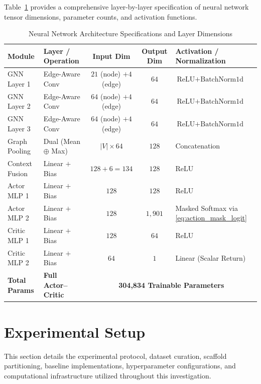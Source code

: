\documentclass{ieeeaccess}
\begin{document}
Table~\ref{tab:network_architecture} provides a comprehensive layer-by-layer specification of neural network tensor dimensions, parameter counts, and activation functions.

\begin{table}[!tbp]
\caption{Neural Network Architecture Specifications and Layer Dimensions}
\label{tab:network_architecture}
\centering
\footnotesize
\begin{tabularx}{\columnwidth}{l l c c X}
\toprule
\textbf{Module} & \textbf{Layer / Operation} & \textbf{Input Dim} & \textbf{Output Dim} & \textbf{Activation / Normalization}\\
\midrule
GNN Layer 1 & Edge-Aware Conv & $21$ (node) $+ 4$ (edge) & $64$ & $\text{ReLU} + \text{BatchNorm1d}$\\
GNN Layer 2 & Edge-Aware Conv & $64$ (node) $+ 4$ (edge) & $64$ & $\text{ReLU} + \text{BatchNorm1d}$\\
GNN Layer 3 & Edge-Aware Conv & $64$ (node) $+ 4$ (edge) & $64$ & $\text{ReLU} + \text{BatchNorm1d}$\\
Graph Pooling & Dual (Mean $\oplus$ Max) & $|V| \times 64$ & $128$ & Concatenation\\
Context Fusion & Linear $+$ Bias & $128 + 6 = 134$ & $128$ & $\text{ReLU}$\\
\midrule
Actor MLP 1 & Linear $+$ Bias & $128$ & $128$ & $\text{ReLU}$\\
Actor MLP 2 & Linear $+$ Bias & $128$ & $1,901$ & Masked Softmax via \eqref{eq:action_mask_logit}\\
\midrule
Critic MLP 1 & Linear $+$ Bias & $128$ & $64$ & $\text{ReLU}$\\
Critic MLP 2 & Linear $+$ Bias & $64$ & $1$ & Linear (Scalar Return)\\
\midrule
\textbf{Total Params} & \textbf{Full Actor--Critic} & \multicolumn{3}{c}{\textbf{304,834 Trainable Parameters}}\\
\bottomrule
\end{tabularx}
\end{table}


\section{Experimental Setup}
\label{sec:experimental}
This section details the experimental protocol, dataset curation, scaffold partitioning, baseline implementations, hyperparameter configurations, and computational infrastructure utilized throughout this investigation.
\end{document}
